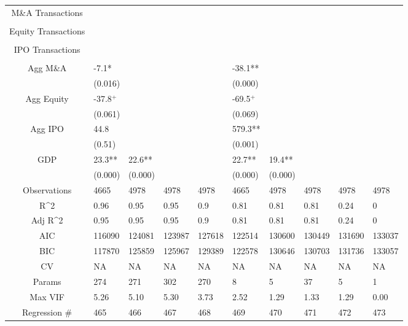 \documentclass{article}
\begin{document}
\begin{table}[H]
\begin{tabular}{|clllllllll|}
  M\&A Transactions &  &  &  &  &  &  &  &  &  \\ 
   &  &  &  &  &  &  &  &  &  \\ 
  Equity Transactions &  &  &  &  &  &  &  &  &  \\ 
   &  &  &  &  &  &  &  &  &  \\ 
  IPO Transactions &  &  &  &  &  &  &  &  &  \\ 
   &  &  &  &  &  &  &  &  &  \\ 
  Agg M\&A & -7.1* &  &  &  & -38.1** &  &  &  &  \\ 
   & (0.016) &  &  &  & (0.000) &  &  &  &  \\ 
  Agg Equity & -37.8$^{+}$ &  &  &  & -69.5$^{+}$ &  &  &  &  \\ 
   & (0.061) &  &  &  & (0.069) &  &  &  &  \\ 
  Agg IPO & 44.8 &  &  &  & 579.3** &  &  &  &  \\ 
   & (0.51) &  &  &  & (0.001) &  &  &  &  \\ 
  GDP & 23.3** & 22.6** &  &  & 22.7** & 19.4** &  &  &  \\ 
   & (0.000) & (0.000) &  &  & (0.000) & (0.000) &  &  &  \\ 
  \hline 
 Observations & 4665 & 4978 & 4978 & 4978 & 4665 & 4978 & 4978 & 4978 & 4978 \\ 
  R^2 & 0.96 & 0.95 & 0.95 & 0.9 & 0.81 & 0.81 & 0.81 & 0.24 & 0 \\ 
  Adj R^2 & 0.95 & 0.95 & 0.95 & 0.9 & 0.81 & 0.81 & 0.81 & 0.24 & 0 \\ 
  AIC & 116090 & 124081 & 123987 & 127618 & 122514 & 130600 & 130449 & 131690 & 133037 \\ 
  BIC & 117870 & 125859 & 125967 & 129389 & 122578 & 130646 & 130703 & 131736 & 133057 \\ 
  CV & NA & NA & NA & NA & NA & NA & NA & NA & NA \\ 
  Params & 274 & 271 & 302 & 270 & 8 & 5 & 37 & 5 & 1 \\ 
  Max VIF & 5.26 & 5.10 & 5.30 & 3.73 & 2.52 & 1.29 & 1.33 & 1.29 & 0.00 \\ 
  Regression \# & 465 & 466 & 467 & 468 & 469 & 470 & 471 & 472 & 473 \\ 
   \hline
\end{tabular}
 
\end{table}
\end{document}
